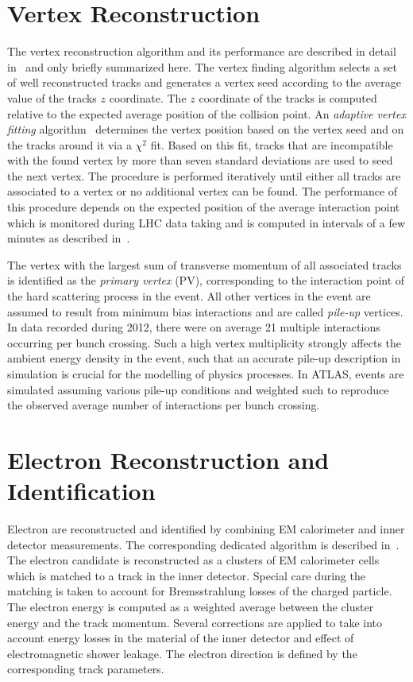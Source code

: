 \section{Vertex Reconstruction}
The vertex reconstruction algorithm and its performance are described in detail in~\cite{AtlasCSCBook,VertexPerf} and
only briefly summarized here.
The vertex finding algorithm selects a set of well reconstructed tracks and generates
a vertex  seed according to the average value of the tracks $z$ coordinate. The $z$ coordinate of the tracks
is computed relative to  the expected average position of the collision point. 
An \emph{adaptive vertex fitting} algorithm~\cite{Vertex} determines the vertex position based on the vertex seed  and on the 
tracks around it via a $\chi^2$ fit.  Based on this fit, tracks that are incompatible with the found vertex by more than seven standard deviations
are used to seed the next vertex. The procedure is performed iteratively until either all tracks are associated to a vertex
 or no additional vertex can be found.
The performance of this procedure depends  on the expected position of the average interaction point which is monitored 
during LHC data taking and is computed in intervals of a  few minutes as described in~\cite{beamspot}.

The vertex with the largest sum of transverse momentum of all associated tracks is identified as the \emph{primary vertex} (PV), 
corresponding to  the interaction point of the hard scattering process in the event. All  other vertices in the event
are assumed to result from minimum bias interactions and are called \emph{pile-up} vertices.
In data recorded during 2012, there were on  average  21 multiple interactions  occurring per bunch crossing.
Such a high vertex multiplicity strongly affects the ambient energy density in the event,
such that an accurate pile-up description in simulation is  crucial for the modelling of physics processes. In ATLAS, 
events are simulated assuming various pile-up conditions and weighted such to reproduce  the observed 
average number of interactions per bunch crossing.


\section{Electron Reconstruction and Identification} \label{sec:elec}
Electron are reconstructed and identified by combining EM calorimeter and inner detector measurements.
The corresponding dedicated  algorithm is described in~\cite{electronAlgo}.
The electron candidate is reconstructed as a  clusters of EM calorimeter cells which is matched to a track
in the inner detector. Special care during the matching is taken to account for 
Bremsstrahlung losses of the charged particle.
The electron energy is computed as 
a weighted average between the cluster energy and the track momentum. Several corrections are applied to
take into account energy losses in the material of the inner detector and effect of electromagnetic shower 
leakage. The electron direction is defined by the corresponding track parameters. 

